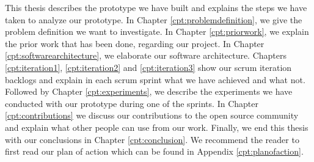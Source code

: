 This thesis describes the prototype we have built and explains the steps we have taken to analyze our prototype. In Chapter \ref{cpt:problemdefinition}, we give the problem definition we want to investigate. In Chapter \ref{cpt:priorwork}, we explain the prior work that has been done, regarding our project. In Chapter \ref{cpt:softwarearchitecture}, we elaborate our software architecture. Chapters \ref{cpt:iteration1}, \ref{cpt:iteration2} and \ref{cpt:iteration3} show our scrum iteration backlogs and explain in each scrum sprint what we have achieved and what not. Followed by Chapter \ref{cpt:experiments}, we describe the experiments we have conducted with our prototype during one of the sprints. In Chapter \ref{cpt:contributions} we discuss our contributions to the open source community and explain what other people can use from our work. Finally, we end this thesis with our conclusions in Chapter \ref{cpt:conclusion}. We recommend the reader to first read our plan of action which can be found in Appendix \ref{cpt:planofaction}.
